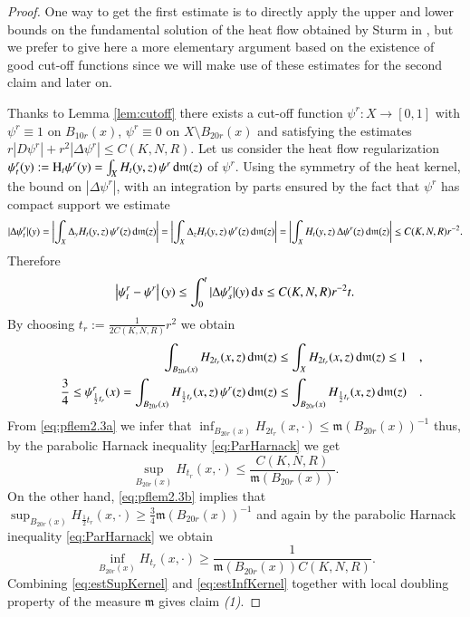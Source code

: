 \documentclass[11pt,reqno]{amsart}
\newcommand{\mm}{\mathfrak m}
\renewcommand{\H}{{\rm H}}
\renewcommand{\d}{{\rm{d}}}
\theoremstyle{definition}
\theoremstyle{remark}
\theoremstyle{remark}
\theoremstyle{remark}
\theoremstyle{remark}
\theoremstyle{remark}
\theoremstyle{remark}
\theoremstyle{remark}
\begin{document}
\begin{proof}
One way to get the first estimate is to directly apply the upper and lower bounds on the fundamental solution of the heat flow obtained by Sturm in \cite[Section 4]{Sturm96}, but we prefer to  give here a more elementary argument \cite{CN} based on the existence of good cut-off functions since we will make use of these estimates for the second claim and later on. 

Thanks to Lemma \ref{lem:cutoff} there exists a cut-off function $\psi^r:X \to [0,1]$ with $\psi^r\equiv 1$ on $B_{10r}(x)$, $\psi^r\equiv 0$ on $X\setminus B_{20r}(x)$ and satisfying the estimates $r|D\psi^r|+r^2|\Delta \psi^r|\leq C(K,N,R)$. Let us consider the heat flow regularization $\psi^r_t(y):=\H_t \psi^r (y)=\int_X H_t(y,z) \, \psi^r \, \d \mm(z)$ of $\psi^r$.  Using the symmetry  of the heat kernel, the bound on $|\Delta \psi^r|$, with an integration by parts ensured by the fact that $\psi^r$ has compact support we estimate
$$|\Delta \psi^r_t|(y)= \left|\int_{X} \Delta_y H_t(y,z) \, \psi^r(z) \, \d \mm(z)\right| = \left|\int_{X} \Delta_z H_t(y,z) \, \psi^r(z) \, \d \mm(z) \right|=\left|\int_{X} H_t(y,z) \, \Delta \psi^r(z) \, \d \mm(z)\right|\leq C(K,N,R) r^{-2}. $$
Therefore
$$\left| \psi^r_t-\psi^r \right|(y)\leq \int_0^t |\Delta \psi^r_s|(y) \, \d s \leq C(K,N,R) r^{-2} t. $$
By choosing $t_r:=\frac{1}{2 C(K,N,R)} r^2$ we obtain
\begin{eqnarray}
&&\int_{B_{20r}(x)} H_{2t_r}(x,z)\, \d\mm(z) \leq \int_{X} H_{2t_r}(x,z)\, \d\mm(z) \leq 1 \quad, \label{eq:pflem2.3a}\\
&&\frac{3}{4}\leq \psi^{r}_{\frac{1}{2}t_r}(x)= \int_{B_{20r}(x)} H_{\frac{1}{2}t_r}(x,z)\, \psi^r(z)\, \d\mm(z) \leq  \int_{B_{20r}(x)} H_{\frac{1}{2}t_r}(x,z) \, \d\mm(z) \quad. \label{eq:pflem2.3b}
\end{eqnarray}
From \eqref{eq:pflem2.3a} we infer that $\inf_{B_{20 r}(x)} H_{2t_r}(x,\cdot) \leq  \mm(B_{20 r}(x))^{-1}$ thus, by  the parabolic Harnack inequality \eqref{eq:ParHarnack} we get
\begin{equation}\label{eq:estSupKernel}
\sup_{B_{20 r}(x)} H_{t_r}(x,\cdot) \leq \frac{C(K,N,R)}{\mm(B_{20 r}(x))}.
\end{equation}
On the other hand, \eqref{eq:pflem2.3b} implies that  $\sup_{B_{20 r}(x)} H_{\frac{1}{2}t_r}(x,\cdot)\geq \frac{3}{4} \mm(B_{20 r}(x))^{-1}$ and again by the parabolic Harnack inequality \eqref{eq:ParHarnack} we obtain
\begin{equation}\label{eq:estInfKernel}
\inf_{B_{20 r}(x)} H_{t_r}(x,\cdot) \geq \frac{1}{\mm(B_{20 r}(x)) C(K,N,R)}.
\end{equation}
Combining \eqref{eq:estSupKernel} and  \eqref{eq:estInfKernel} together with local doubling property of the measure $\mm$ gives claim \emph{(1)}.


\end{proof}
\end{document}
